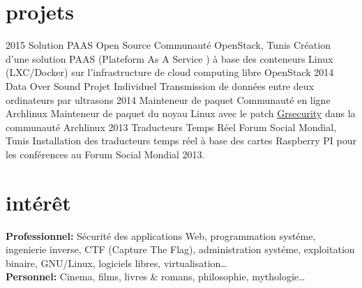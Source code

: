 \documentclass[]{friggeri-cv}
\begin{document}
\section{projets}

\begin{entrylist}
\entry
{2015}
{Solution PAAS Open Source}
{Communauté OpenStack, Tunis}
{Création d’une solution PAAS (Plateform As A Service ) à base des conteneurs Linux (LXC/Docker) sur l’infrastructure de cloud computing libre OpenStack}
\entry
{2014}
{Data Over Sound}
{Projet Individuel}
{Transmission de données entre deux ordinateurs par ultrasons}
\entry
{2014}
{Mainteneur de paquet}
{Communauté en ligne Archlinux}
{Mainteneur de paquet du noyau Linux avec le patch \href{https://grsecurity.net/}{Grsecurity} dans la communauté Archlinux}
\entry
{2013}
{Traducteurs Temps Réel}
{Forum Social Mondial, Tunis}
{Installation des traducteurs temps réel à base des cartes Raspberry PI pour les conférences au Forum Social Mondial 2013.}
\end{entrylist}




\section{intérêt}

\textbf{Professionnel:} Sécurité des applications Web, programmation systéme, ingenierie inverse, CTF (Capture The Flag), administration systéme, exploitation binaire, GNU/Linux, logiciels libres, virtualisation\ldots\\
\textbf{Personnel:} Cinema, films, livres \& romans, philosophie, mythologie\ldots

\end{document}
